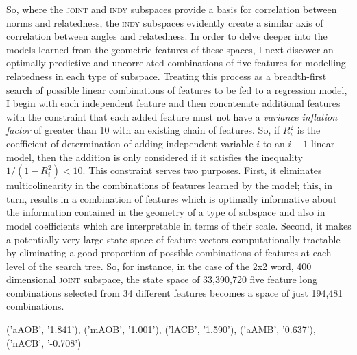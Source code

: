 So, where the \textsc{joint} and \textsc{indy} subspaces provide a basis for correlation between norms and relatedness, the \textsc{indy} subspaces evidently create a similar axis of correlation between angles and relatedness.  In order to delve deeper into the models learned from the geometric features of these spaces, I next discover an optimally predictive and uncorrelated combinations of five features for modelling relatedness in each type of subspace.  Treating this process as a breadth-first search of possible linear combinations of features to be fed to a regression model, I begin with each independent feature and then concatenate additional features with the constraint that each added feature must not have a \emph{variance inflation factor} \cite{OBrien2007} of greater than 10 with an existing chain of features.  So, if $R_{i}^{2}$ is the coefficient of determination of adding independent variable $i$ to an $i-1$ linear model, then the addition is only considered if it satisfies the inequality $1/(1-R_{i}^{2}) < 10$. This constraint serves two purposes.  First, it eliminates multicolinearity in the combinations of features learned by the model; this, in turn, results in a combination of features which is optimally informative about the information contained in the geometry of a type of subspace and also in model coefficients which are interpretable in terms of their scale.  Second, it makes a potentially very large state space of feature vectors computationally tractable by eliminating a good proportion of possible combinations of features at each level of the search tree.  So, for instance, in the case of the 2x2 word, 400 dimensional \textsc{joint} subspace, the state space of 33,390,720 five feature long combinations selected from 34 different features becomes a space of just 194,481 combinations.

('aAOB', '1.841'), ('mAOB', '1.001'), ('lACB', '1.590'), ('aAMB', '0.637'), ('nACB', '-0.708')

